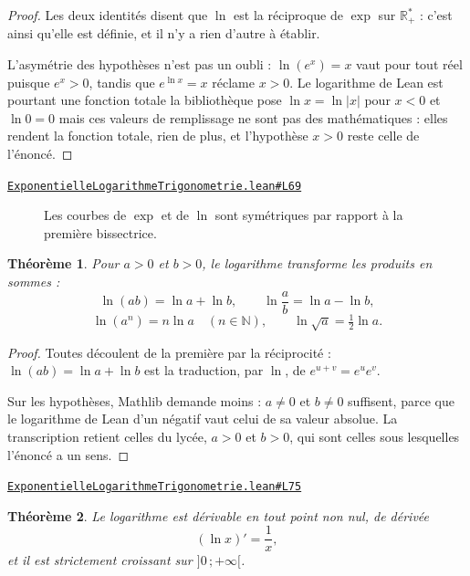 \documentclass[11pt,a4paper]{article}
\theoremstyle{definition}
\theoremstyle{plain}
\newtheorem{theoreme}{Théorème}
\newcommand{\source}[2]{\par\smallskip\noindent\hfill{\footnotesize\href{#1}{\texttt{#2}}}\par\smallskip}
\begin{document}
\begin{proof}
Les deux identités disent que $\ln$ est la réciproque de $\exp$ sur $\mathbb{R}_{+}^{*}$ :
c'est ainsi qu'elle est définie, et il n'y a rien d'autre à établir.

\medskip\noindent
L'asymétrie des hypothèses n'est pas un oubli : $\ln(e^{x}) = x$ vaut pour tout réel
puisque $e^{x} > 0$, tandis que $e^{\ln x} = x$ réclame $x > 0$. Le logarithme de Lean est
pourtant une fonction totale \textemdash{} la bibliothèque pose $\ln x = \ln|x|$ pour
$x < 0$ et $\ln 0 = 0$ \textemdash{} mais ces valeurs de remplissage ne sont pas des
mathématiques : elles rendent la fonction totale, rien de plus, et l'hypothèse $x > 0$ reste
celle de l'énoncé.
\end{proof}
\source{https://github.com/Commutator-IO/learn-lean/blob/main/courses/02-lycee/05-exponentielle-logarithme-trigonometrie/ExponentielleLogarithmeTrigonometrie.lean\#L69}{ExponentielleLogarithmeTrigonometrie.lean\#L69}

\begin{figure}[h]
\centering

\caption{Les courbes de $\exp$ et de $\ln$ sont symétriques par rapport à la première bissectrice.}
\end{figure}

\begin{theoreme}
Pour $a > 0$ et $b > 0$, le logarithme transforme les produits en sommes :
\[ \ln(ab) = \ln a + \ln b, \qquad \ln\frac{a}{b} = \ln a - \ln b, \]
\[ \ln(a^{n}) = n \ln a \quad (n \in \mathbb{N}), \qquad
   \ln\sqrt{a} = \tfrac{1}{2}\ln a . \]
\end{theoreme}

\begin{proof}
Toutes découlent de la première par la réciprocité : $\ln(ab) = \ln a + \ln b$ est la
traduction, par $\ln$, de $e^{u+v} = e^{u}e^{v}$.

\medskip\noindent
Sur les hypothèses, Mathlib demande moins : $a \ne 0$ et $b \ne 0$ suffisent, parce que le
logarithme de Lean d'un négatif vaut celui de sa valeur absolue. La transcription retient
celles du lycée, $a > 0$ et $b > 0$, qui sont celles sous lesquelles l'énoncé a un sens.
\end{proof}
\source{https://github.com/Commutator-IO/learn-lean/blob/main/courses/02-lycee/05-exponentielle-logarithme-trigonometrie/ExponentielleLogarithmeTrigonometrie.lean\#L75}{ExponentielleLogarithmeTrigonometrie.lean\#L75}

\begin{theoreme}
Le logarithme est dérivable en tout point non nul, de dérivée
\[ (\ln x)' = \frac{1}{x} , \]
et il est strictement croissant sur $]0\,;+\infty[$.
\end{theoreme}
\end{document}
